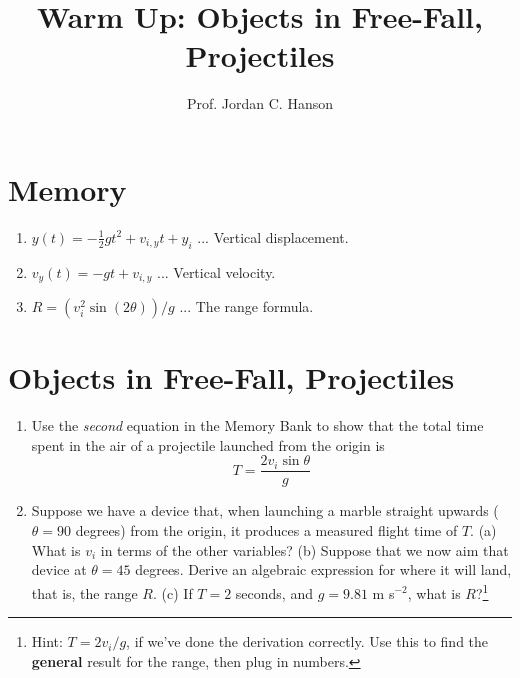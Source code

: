 \documentclass{article}
\begin{document}
\title{Warm Up: Objects in Free-Fall, Projectiles}
\author{Prof. Jordan C. Hanson}

\maketitle

\section{Memory}

\begin{enumerate}
\item $y(t) = -\frac{1}{2}g t^2 + v_{i,y} t + y_i$ ... Vertical displacement.
\item $v_y(t) = -g t + v_{i,y}$ ... Vertical velocity.
\item $R = (v_i^2 \sin(2\theta))/g$ ... The range formula.
\end{enumerate}

\section{Objects in Free-Fall, Projectiles}

\begin{enumerate}
\item Use the \textit{second} equation in the Memory Bank to show that the total time spent in the air of a projectile launched from the origin is 
\begin{equation}
T = \frac{2 v_i \sin\theta}{g} \label{eq:1}
\end{equation}
\item Suppose we have a device that, when launching a marble straight upwards ($\theta = 90$ degrees) from the origin, it produces a measured flight time of $T$.  (a) What is $v_i$ in terms of the other variables? (b) Suppose that we now aim that device at $\theta = 45$ degrees.  Derive an algebraic expression for where it will land, that is, the range $R$. (c) If $T = 2$ seconds, and $g = 9.81$ m s$^{-2}$, what is $R$?\footnote{Hint: $T = 2v_i/g$, if we've done the derivation correctly.  Use this to find the \textbf{general} result for the range, then plug in numbers.}
\end{enumerate}
\end{document}
